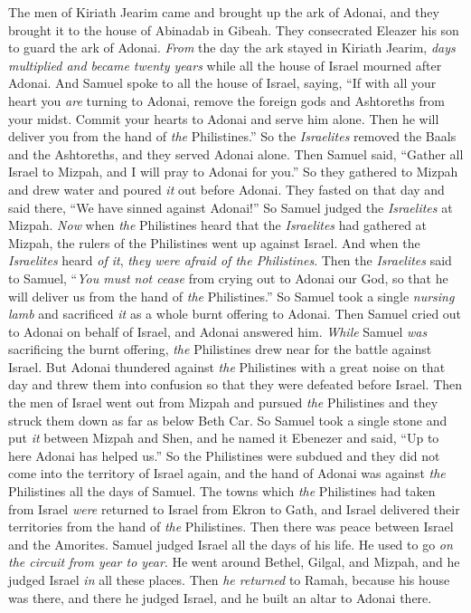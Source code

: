\begin{biblechapter} %
 The men of Kiriath Jearim came and brought up the ark of Adonai, and they brought it to the house of Abinadab in Gibeah. They consecrated Eleazer his son to guard the ark of Adonai.
\verse \textit{From} the day the ark stayed in Kiriath Jearim, \textit{days multiplied and became twenty years} while all the house of Israel mourned after Adonai.
\verse And Samuel spoke to all the house of Israel, saying, “If with all your heart you \textit{are} turning to Adonai, remove the foreign gods and Ashtoreths from your midst. Commit your hearts to Adonai and serve him alone. Then he will deliver you from the hand of \textit{the} Philistines.”
\verse So the \textit{Israelites} removed the Baals and the Ashtoreths, and they served Adonai alone.
\verse Then Samuel said, “Gather all Israel to Mizpah, and I will pray to Adonai for you.”
\verse So they gathered to Mizpah and drew water and poured \textit{it} out before Adonai. They fasted on that day and said there, “We have sinned against Adonai!” So Samuel judged the \textit{Israelites} at Mizpah.
\verse \textit{Now} when \textit{the} Philistines heard that the \textit{Israelites} had gathered at Mizpah, the rulers of the Philistines went up against Israel. And when the \textit{Israelites} heard \textit{of it}, \textit{they were afraid of the Philistines}.
\verse Then the \textit{Israelites} said to Samuel, “\textit{You must not cease} from crying out to Adonai our God, so that he will deliver us from the hand of \textit{the} Philistines.”
\verse So Samuel took a single \textit{nursing lamb} and sacrificed \textit{it} as a whole burnt offering to Adonai. Then Samuel cried out to Adonai on behalf of Israel, and Adonai answered him.
\verse \textit{While} Samuel \textit{was} sacrificing the burnt offering, \textit{the} Philistines drew near for the battle against Israel. But Adonai thundered against \textit{the} Philistines with a great noise on that day and threw them into confusion so that they were defeated before Israel.
\verse Then the men of Israel went out from Mizpah and pursued \textit{the} Philistines and they struck them down as far as below Beth Car.
\verse So Samuel took a single stone and put \textit{it} between Mizpah and Shen, and he named it Ebenezer and said, “Up to here Adonai has helped us.”
\verse So the Philistines were subdued and they did not come into the territory of Israel again, and the hand of Adonai was against \textit{the} Philistines all the days of Samuel.
\verse The towns which \textit{the} Philistines had taken from Israel \textit{were} returned to Israel from Ekron to Gath, and Israel delivered their territories from the hand of \textit{the} Philistines. Then there was peace between Israel and the Amorites.
 Samuel judged Israel all the days of his life.
\verse He used to go \textit{on the circuit} \textit{from year to year}. He went around Bethel, Gilgal, and Mizpah, and he judged Israel \textit{in} all these places.
\verse Then \textit{he returned} to Ramah, because his house was there, and there he judged Israel, and he built an altar to Adonai there.
\end{biblechapter}

